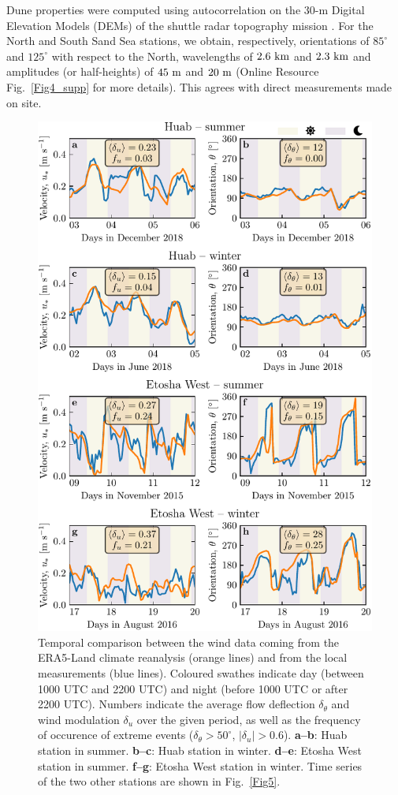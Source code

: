 Dune properties were computed using autocorrelation on the 30-m Digital Elevation Models (DEMs) of the shuttle radar topography mission \citep{Farr2007}. For the North and South Sand Sea stations, we obtain, respectively, orientations of $85^\circ$ and $125^\circ$ with respect to the North, wavelengths of $2.6~\textup{km}$ and $2.3~\textup{km}$ and amplitudes (or half-heights) of $45~\textup{m}$ and $20~\textup{m}$ (Online Resource Fig.~\ref{Fig4_supp} for more details). This agrees with direct measurements made on site.


\begin{figure}
\centering
\includegraphics[scale=1]{Figures/Figure3.pdf}
\caption{Temporal comparison between the wind data coming from the ERA5-Land climate reanalysis (orange lines) and from the local measurements (blue lines). Coloured swathes indicate day (between 1000 UTC and 2200 UTC) and night (before 1000 UTC or after 2200 UTC). Numbers indicate the average flow deflection $\delta_{\theta}$ and wind modulation $\delta_{u}$ over the given period, as well as the frequency of occurence of extreme events ($\delta_{\theta} > 50^\circ$, $\vert\delta_{u}\vert > 0.6$). \textbf{a--b}: Huab station in summer. \textbf{b--c}: Huab station in winter. \textbf{d--e}: Etosha West station in summer. \textbf{f--g}: Etosha West station in winter. Time series of the two other stations are shown in Fig.~\ref{Fig5}.}
\label{Fig3}
\end{figure}
